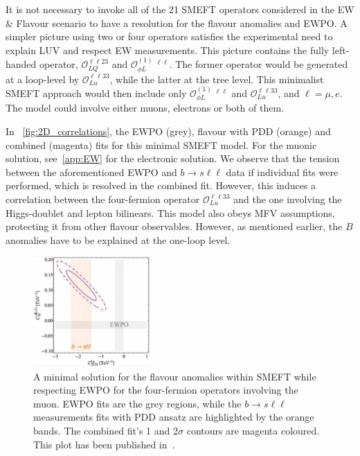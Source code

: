 \par It is not necessary to invoke all of the 21 SMEFT operators considered in the { EW \& Flavour} scenario to have a resolution for the flavour anomalies and EWPO. A simpler picture using two or four operators satisfies the experimental need to explain LUV and respect EW measurements. This picture contains the fully left-handed operator, $\mathcal{O}_{LQ}^{\ell \ell 2 3}$ and $\mathcal{O}_{\phi L}^{(1)} \ ^{\ell \ell}$. The former operator would be generated at a loop-level by $\mathcal{O}_{Lu}^{\ell \ell 3 3}$, while the latter at the tree level.  This minimalist SMEFT approach would then include only  $\mathcal{O}_{\phi L}^{(1)} \ ^{\ell \ell}$ and $\mathcal{O}_{Lu}^{\ell \ell 3 3}$, and $\ell= \mu, e$.  The model could involve either muons, electrons or both of them.
\par In~ \autoref{fig:2D_correlations}, the EWPO (grey), flavour with PDD (orange) and combined (magenta) fits for this minimal SMEFT model. For the muonic solution, see~\autoref{app:EW} for the electronic solution. We observe that the tension between the aforementioned EWPO and $b \to s \ell \ell$ data if individual fits were performed, which is resolved in the combined fit. However, this induces a correlation between the four-fermion operator $\mathcal{O}_{Lu}^{\ell \ell 3 3}$ and the one involving the Higgs-doublet and lepton bilinears. This model also obeys MFV assumptions, protecting it from other flavour observables. However, as mentioned earlier, the $B$ anomalies have to be explained at the one-loop level. 
\begin{figure}[htpb!]
	\centering
	\includegraphics[width=0.4\textwidth]{figures/CHL_CLu_m.pdf}
	\caption{ A minimal solution for the flavour anomalies within SMEFT while respecting EWPO for the four-fermion operators involving the muon. EWPO fits are the grey regions, while the $b \to s\ell \ell$ measurements fits with PDD ansatz are highlighted by the orange bands. The combined fit's 1 and 2$\sigma$ contours are magenta coloured. This plot has been published in~\cite{Alasfar:2020mne}.  } 
	\label{fig:2D_correlations}
\end{figure}
